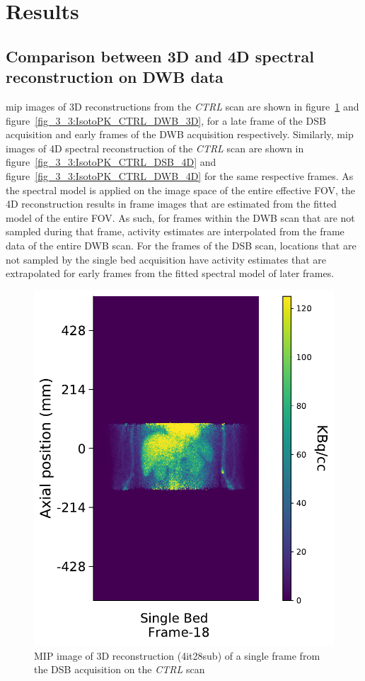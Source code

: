\section{Results}
\subsection{Comparison between 3D and 4D spectral reconstruction on DWB data}
\Gls{mip} images of 3D reconstructions from the \textit{CTRL} scan are shown in figure~\ref{fig_3_3:IsotoPK_CTRL_DSB_3D} and figure~\ref{fig_3_3:IsotoPK_CTRL_DWB_3D}, for a late frame of the DSB acquisition and early frames of the DWB acquisition respectively. 
Similarly, \gls{mip} images of 4D spectral reconstruction of the \textit{CTRL} scan are shown in figure~\ref{fig_3_3:IsotoPK_CTRL_DSB_4D} and figure~\ref{fig_3_3:IsotoPK_CTRL_DWB_4D} for the same respective frames. 
As the spectral model is applied on the image space of the entire effective FOV, the 4D reconstruction results in frame images that are estimated from the fitted model of the entire FOV. As such, for frames within the DWB scan that are not sampled during that frame, activity estimates are interpolated from the frame data of the entire DWB scan. For the frames of the DSB scan, locations that are not sampled by the single bed acquisition have activity estimates that are extrapolated for early frames from the fitted spectral model of later frames.

\begin{figure} [h!]
\centering
\includegraphics[scale=0.52,angle=0]{3_Results/3_3_DWB_Reconstruction/figures/3_3_IsotoPK_CTRL_DSB_3D.pdf}
\caption{MIP image of 3D reconstruction (4it28sub) of a single frame from the DSB acquisition on the \textit{CTRL} scan}
\label{fig_3_3:IsotoPK_CTRL_DSB_3D}
\end{figure} 

